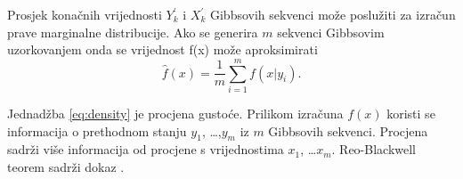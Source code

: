 Prosjek konačnih vrijednosti $Y_{k}^{'}$ i $X_{k}^{'}$ Gibbsovih sekvenci može poslužiti za izračun prave marginalne distribucije. Ako se generira $m$ sekvenci Gibbsovim uzorkovanjem onda se vrijednost f(x) može aproksimirati 
\begin{equation} \label{eq:density}
\hat{f}(x) = \frac{1}{m}	\sum_{i=1}^{m} f(x|y_i).
\end{equation}

Jednadžba \eqref{eq:density} je procjena gustoće. Prilikom izračuna $f(x)$ koristi se informacija o prethodnom stanju $y_1$, \dots ,$y_m$ iz $m$ Gibbsovih sekvenci. Procjena sadrži više informacija od procjene s vrijednostima $x_1$, \dots $x_m$. Reo-Blackwell teorem sadrži dokaz \citep{casella1996rao}.

